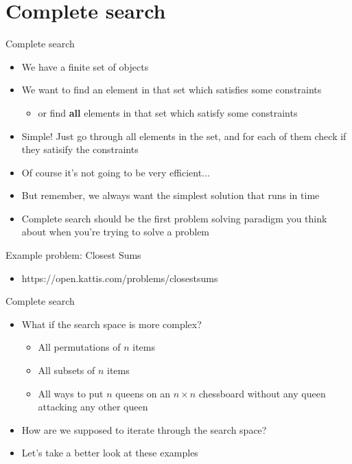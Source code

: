 \documentclass[10pt]{beamer}
\newcommand{\bi}{\begin{itemize}}
\newcommand{\ei}{\end{itemize}}
\begin{document}
\section{Complete search}
\begin{frame}{Complete search}
    \bi
        \item We have a finite set of objects
        \item We want to find an element in that set which satisfies some constraints
            \bi
                \item or find \textbf{all} elements in that set which satisfy some constraints
            \ei

        \vspace{5pt}
        \item Simple! Just go through all elements in the set, and for each of them check if they satisify the constraints
        \item Of course it's not going to be very efficient...
        \item But remember, we always want the simplest solution that runs in time
        \item Complete search should be the first problem solving paradigm you think about when you're trying to solve a problem
    \ei
\end{frame}

\begin{frame}{Example problem: Closest Sums}
    \bi
        \item https://open.kattis.com/problems/closestsums
    \ei
\end{frame}

\begin{frame}{Complete search}
    \bi
        \item What if the search space is more complex?
            \bi
                \item All permutations of $n$ items
                \item All subsets of $n$ items
                \item All ways to put $n$ queens on an $n\times n$ chessboard without any queen attacking any other queen
            \ei
        \item How are we supposed to iterate through the search space?
        \item Let's take a better look at these examples
    \ei
\end{frame}
\end{document}
